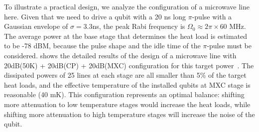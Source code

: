 \documentclass[a4paper,onecolumn,11pt,unpublished]{quantumarticle}
\begin{document}
To illustrate a practical design, we analyze the configuration of a microwave line here. Given that we need to drive a qubit with a 20 ns long $\pi$-pulse with a Gaussian envelope of $\sigma=3.3$ns, the peak Rabi frequency is $\Omega_0\approx 2\pi \times 60$ MHz. The average power at the base stage that determines the heat load is estimated to be -78 dBM,  because the pulse shape and the idle time of the $\pi$-pulse must be considered.  shows the detailed results of the design of a microwave line with 20dB(50K) + 20dB(CP) + 20dB(MXC) configuration for this target power~\cite{Krinner2019Engineering}. The dissipated powers of 25 lines at each stage are all smaller than 5\% of the target heat loads, and the effective temperature of the installed qubits at MXC stage is reasonable (40 mK). This configuration represents an optimal balance: shifting more attenuation to low temperature stages would increase the heat loads, while shifting more attenuation to high temperature stages will increase the noise of the qubit.
\end{document}
